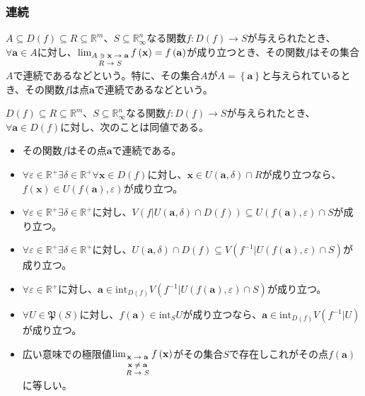 \documentclass[dvipdfmx]{jsarticle}
\begin{document}
\subsubsection{連続}%
\begin{dfn}
$A \subseteq D(f) \subseteq R \subseteq \mathbb{R}^{m}$、$S \subseteq \mathbb{R}_{\infty}^{n}$なる関数$f:D(f) \rightarrow S$が与えられたとき、$\forall\mathbf{a} \in A$に対し、$\lim_{\scriptsize \begin{matrix} A \ni \mathbf{x} \rightarrow \mathbf{a} \\ R \rightarrow S \end{matrix}}{f\left( \mathbf{x} \right)} = f\left( \mathbf{a} \right)$が成り立つとき、その関数$f$はその集合$A$で連続であるなどという。特に、その集合$A$が$A = \left\{ \mathbf{a} \right\}$と与えられているとき、その関数$f$は点$\mathbf{a}$で連続であるなどという。
\end{dfn}
\begin{thm}\label{4.1.10.16}
$D(f) \subseteq R \subseteq \mathbb{R}^{m}$、$S \subseteq \mathbb{R}_{\infty}^{n}$なる関数$f:D(f) \rightarrow S$が与えられたとき、$\forall\mathbf{a} \in D(f)$に対し、次のことは同値である。
\begin{itemize}
\item
  その関数$f$はその点$\mathbf{a}$で連続である。
\item
  $\forall\varepsilon \in \mathbb{R}^{+}\exists\delta \in \mathbb{R}^{+}\forall\mathbf{x} \in D(f)$に対し、$\mathbf{x} \in U\left( \mathbf{a},\delta \right) \cap R$が成り立つなら、$f\left( \mathbf{x} \right) \in U\left( f\left( \mathbf{a} \right),\varepsilon \right)$が成り立つ。
\item
  $\forall\varepsilon \in \mathbb{R}^{+}\exists\delta \in \mathbb{R}^{+}$に対し、$V\left( f|U\left( \mathbf{a},\delta \right) \cap D(f) \right) \subseteq U\left( f\left( \mathbf{a} \right),\varepsilon \right) \cap S$が成り立つ。
\item
  $\forall\varepsilon \in \mathbb{R}^{+}\exists\delta \in \mathbb{R}^{+}$に対し、$U\left( \mathbf{a},\delta \right) \cap D(f) \subseteq V\left( f^{- 1}|U\left( f\left( \mathbf{a} \right),\varepsilon \right) \cap S \right)$が成り立つ。
\item
  $\forall\varepsilon \in \mathbb{R}^{+}$に対し、$\mathbf{a} \in \mathrm{int}_{D(f)}{V\left( f^{- 1}|U\left( f\left( \mathbf{a} \right),\varepsilon \right) \cap S \right)}$が成り立つ。
\item
  $\forall U \in \mathfrak{P}(S)$に対し、$f\left( \mathbf{a} \right) \in \mathrm{int}_{S}U$が成り立つなら、$\mathbf{a} \in \mathrm{int}_{D(f)}{V\left( f^{- 1}|U \right)}$が成り立つ。
\item
  広い意味での極限値$\lim_{\scriptsize \begin{matrix} \mathbf{x} \rightarrow \mathbf{a} \\ \mathbf{x} \neq \mathbf{a} \\ R \rightarrow S \\\end{matrix}}{f\left( \mathbf{x} \right)}$がその集合$S$で存在しこれがその点$f\left( \mathbf{a} \right)$に等しい。
\end{itemize}
\end{thm}
\end{document}
